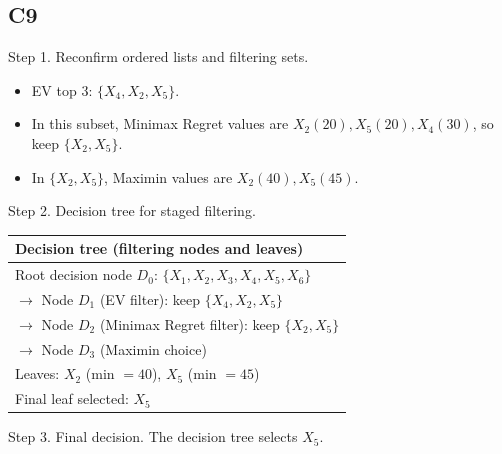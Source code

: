 \begin{ExamProblems}
		\subsection*{C9}
		Step 1. Reconfirm ordered lists and filtering sets.
		\begin{itemize}
			\item EV top 3: $\{X_4,X_2,X_5\}$.
			\item In this subset, Minimax Regret values are $X_2(20),X_5(20),X_4(30)$, so keep $\{X_2,X_5\}$.
			\item In $\{X_2,X_5\}$, Maximin values are $X_2(40),X_5(45)$.
		\end{itemize}

		Step 2. Decision tree for staged filtering.
		\begin{center}
			\begin{tabular}{l}
				\toprule
				Decision tree (filtering nodes and leaves) \\
				\midrule
				Root decision node $D_0$: $\{X_1,X_2,X_3,X_4,X_5,X_6\}$ \\
				$\rightarrow$ Node $D_1$ (EV filter): keep $\{X_4,X_2,X_5\}$ \\
				$\rightarrow$ Node $D_2$ (Minimax Regret filter): keep $\{X_2,X_5\}$ \\
				$\rightarrow$ Node $D_3$ (Maximin choice) \\
				Leaves: $X_2$ (min $=40$), $X_5$ (min $=45$) \\
				Final leaf selected: $X_5$ \\
				\bottomrule
			\end{tabular}
		\end{center}

		Step 3. Final decision.
		The decision tree selects $X_5$.

		\newpage
		\item\leavevmode\par

\end{ExamProblems}
